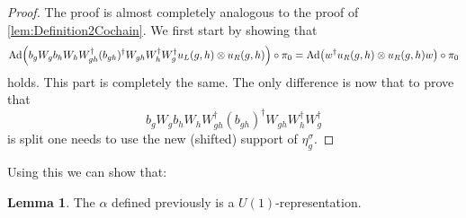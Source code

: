 \documentclass[12pt,a4paper,twoside]{article}
\let\originalleft\left
\let\originalright\right
\renewcommand{\left}{\mathopen{}\mathclose\bgroup\originalleft}
\renewcommand{\right}{\aftergroup\egroup\originalright}
\newcommand{\Ad}[1]{\textrm{Ad}\left(#1\right)}
\theoremstyle{definition}
\newtheorem{lemma}[theorem]{Lemma}
\numberwithin{equation}{section}
\begin{document}
\begin{proof}
The proof is almost completely analogous to the proof of \ref{lem:Definition2Cochain}. We first start by showing that
\begin{equation}
\Ad{b_g W_g b_h W_h W_{gh}^\dagger (b_{gh})^\dagger W_{gh}W_h^\dagger W_g^\dagger u_L(g,h)\otimes u_R(g,h)}\circ\pi_0=\Ad{w^\dagger u_R(g,h)\otimes u_R(g,h) w}\circ\pi_0
\end{equation}
holds. This part is completely the same. The only difference is now that to prove that
\begin{equation}
b_g W_g b_h W_h W_{gh}^\dagger (b_{gh})^\dagger W_{gh}W_h^\dagger W_g^\dagger
\end{equation}
 is split one needs to use the new (shifted) support of $\eta_g^\sigma$.
\end{proof}
Using this we can show that:
\begin{lemma}
	The $\alpha$ defined previously is a $U(1)$-representation.
\end{lemma}
\end{document}
